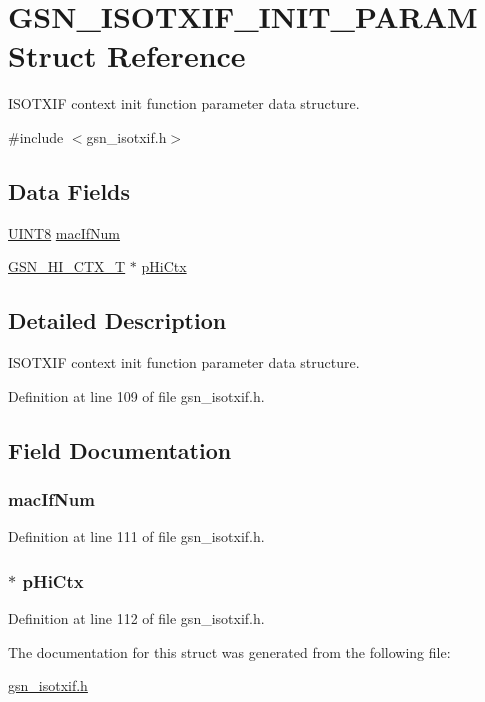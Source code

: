\hypertarget{a00106}{
\section{GSN\_\-ISOTXIF\_\-INIT\_\-PARAM Struct Reference}
\label{a00106}
}


ISOTXIF context init function parameter data structure.  




{\ttfamily \#include $<$gsn\_\-isotxif.h$>$}

\subsection*{Data Fields}
\begin{DoxyCompactItemize}
\item 
\hyperlink{a00660_gab27e9918b538ce9d8ca692479b375b6a}{UINT8} \hyperlink{a00106_ae57ae92e651751e7978e237c55133b4c}{macIfNum}
\item 
\hyperlink{a00085}{GSN\_\-HI\_\-CTX\_\-T} $\ast$ \hyperlink{a00106_ab671e23204d79f8fda7dba9992c3d6e9}{pHiCtx}
\end{DoxyCompactItemize}


\subsection{Detailed Description}
ISOTXIF context init function parameter data structure. 

Definition at line 109 of file gsn\_\-isotxif.h.



\subsection{Field Documentation}
\hypertarget{a00106_ae57ae92e651751e7978e237c55133b4c}{
\subsubsection[{macIfNum}]{ {\bf macIfNum}}}
\label{a00106_ae57ae92e651751e7978e237c55133b4c}


Definition at line 111 of file gsn\_\-isotxif.h.

\hypertarget{a00106_ab671e23204d79f8fda7dba9992c3d6e9}{
\subsubsection[{pHiCtx}]{$\ast$ {\bf pHiCtx}}}
\label{a00106_ab671e23204d79f8fda7dba9992c3d6e9}


Definition at line 112 of file gsn\_\-isotxif.h.



The documentation for this struct was generated from the following file:\begin{DoxyCompactItemize}
\item 
\hyperlink{a00521}{gsn\_\-isotxif.h}\end{DoxyCompactItemize}
